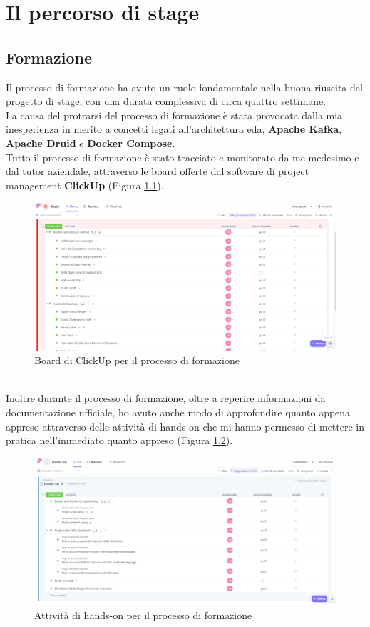 \chapter{Il percorso di stage }\label{cap:Il_percorso}
\section{Formazione}
Il processo di formazione ha avuto un ruolo fondamentale nella buona riuscita del progetto di stage, con una durata complessiva di circa quattro settimane. \\
La causa del protrarsi del processo di formazione è stata provocata dalla mia inesperienza in merito a 
concetti legati all'architettura \gls{eda}{},
\textbf{Apache Kafka}, \textbf{Apache Druid} e \textbf{Docker Compose}.\\  
Tutto il processo di formazione è stato tracciato e monitorato da me medesimo e dal tutor aziendale, attraverso le \gls{board}{} offerte 
dal software di \gls{project management}{} \textbf{ClickUp} (Figura \ref{cap:ClickUp}).\\
\begin{figure}[h]
    \centering
    \includegraphics[width=1\textwidth]{images/percorso/formazione.png}
    \caption{Board di ClickUp per il processo di formazione}
    \label{cap:ClickUp}
\end{figure}
\pagebreak
\\
Inoltre durante il processo di formazione, oltre a reperire informazioni da documentazione ufficiale, ho avuto anche modo 
di approfondire quanto appena appreso attraverso delle attività di \gls{hands-on}{} che mi hanno permesso di mettere in pratica nell'immediato quanto appreso
(Figura \ref{cap:Hands-on}).
\begin{figure}[h]
    \centering
    \includegraphics[width=1\textwidth]{images/percorso/hands_on.png}
    \caption{Attività di hands-on per il processo di formazione}
    \label{cap:Hands-on}
\end{figure}
